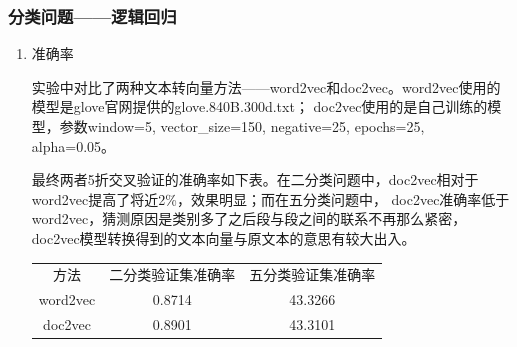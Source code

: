 \documentclass[UTF8,a4paper,12pt]{article}
\begin{document}
\begin{enumerate}[itemindent=0.5em,label=\arabic*、]
\begin{figure}[H]
  \centering
  \end{figure}
\end{enumerate}
\subsubsection{分类问题——逻辑回归}
\begin{enumerate}[itemindent=0.5em,label=\arabic*、]
  \item 准确率
  \par \qquad 实验中对比了两种文本转向量方法——word2vec和doc2vec。word2vec使用的模型是glove官网提供的glove.840B.300d.txt；
  doc2vec使用的是自己训练的模型，参数window=5, vector\_size=150, negative=25, epochs=25, alpha=0.05。
  \par \qquad 最终两者5折交叉验证的准确率如下表。在二分类问题中，doc2vec相对于word2vec提高了将近2\%，效果明显；而在五分类问题中，
  doc2vec准确率低于word2vec，猜测原因是类别多了之后段与段之间的联系不再那么紧密，doc2vec模型转换得到的文本向量与原文本的意思有较大出入。
  \begin{center}
    \begin{tabular}{ccc}
    \hline
    方法 & 二分类验证集准确率 & 五分类验证集准确率\\
    word2vec & 0.8714 & 43.3266\\
    doc2vec & 0.8901 & 43.3101\\
    \hline
    \end{tabular}
  \end{center}
\end{enumerate}
\end{document}
